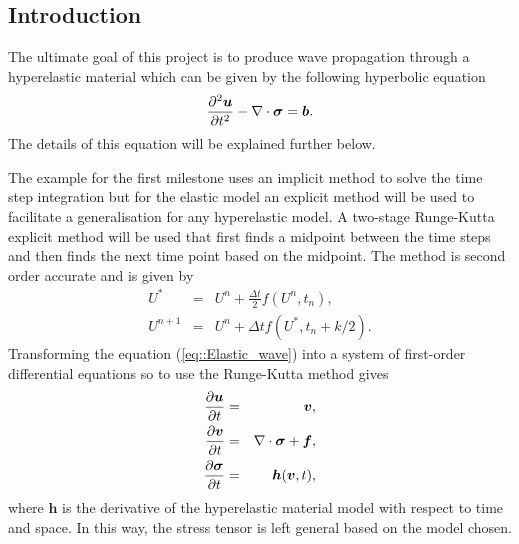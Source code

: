 \subsection{Introduction}
The ultimate goal of this project is to produce wave propagation through a hyperelastic material which can be given by the following hyperbolic equation
\begin{equation}
  \label{eq::Elastic_wave}
  \frac{\partial^2 \bm{u}}{\partial t^2} - \nabla\cdot \bm{\sigma} = \bm{b}.
\end{equation}
The details of this equation will be explained further below.

The example for the first milestone uses an implicit method to solve the time step integration but for the elastic model an explicit method will be used to facilitate a generalisation for any hyperelastic model. A two-stage Runge-Kutta explicit method will be used that first finds a midpoint between the time steps and then finds the next time point based on the midpoint. The method is second order accurate and is given by
\begin{eqnarray*}
  U^* & = & U^n + \frac{\Delta t}{2}f(U^n,t_n), \\
  U^{n+1} & = & U^n + \Delta tf(U^*,t_n+k/2).
\end{eqnarray*}
Transforming the equation (\ref{eq::Elastic_wave}) into a system of first-order differential equations so to use the Runge-Kutta method gives
\begin{eqnarray*}
  \frac{\partial \bm{u}}{\partial t} & = & \bm{v}, \\
  \frac{\partial \bm{v}}{\partial t} & = & \nabla\cdot\bm{\sigma} + \bm{f}, \\
  \frac{\partial \bm{\sigma}}{\partial t} & = & \bm{h}(\bm{v},t),
\end{eqnarray*}
where $\bm{h}$ is the derivative of the hyperelastic material model with respect to time and space. In this way, the stress tensor is left general based on the model chosen.
